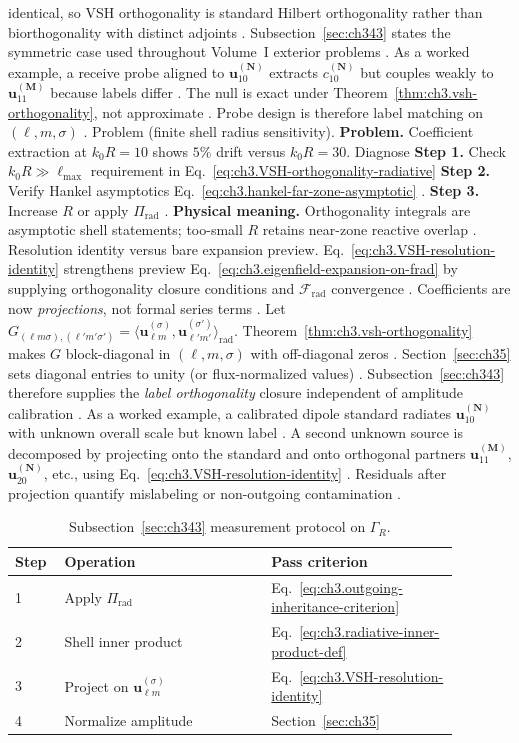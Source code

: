 identical, so VSH orthogonality is standard Hilbert orthogonality rather than biorthogonality with distinct adjoints
. Subsection~\ref{sec:ch343} states the symmetric case used throughout Volume~I
exterior problems .
As a worked example, a receive probe aligned to \(\mathbf{u}_{10}^{(\mathbf{N})}\) extracts \(c_{10}^{(\mathbf{N})}\) but couples weakly to
\(\mathbf{u}_{11}^{(\mathbf{M})}\) because labels differ . The null is exact under
Theorem~\ref{thm:ch3.vsh-orthogonality}, not approximate . Probe design is therefore label matching on
\((\ell,m,\sigma)\) .
Problem (finite shell radius sensitivity). \textbf{Problem.} Coefficient extraction at \(k_{0}R=10\) shows \(5\%\) drift versus \(k_{0}R=30\). Diagnose
\textbf{Step 1.} Check \(k_{0}R\gg\ell_{\max}\) requirement in Eq.~\eqref{eq:ch3.VSH-orthogonality-radiative}
\textbf{Step 2.} Verify Hankel asymptotics Eq.~\eqref{eq:ch3.hankel-far-zone-asymptotic} .
\textbf{Step 3.} Increase \(R\) or apply \(\Pi_{\mathrm{rad}}\) .
\textbf{Physical meaning.} Orthogonality integrals are asymptotic shell statements; too-small \(R\) retains near-zone
reactive overlap .
Resolution identity versus bare expansion preview. Eq.~\eqref{eq:ch3.VSH-resolution-identity} strengthens preview Eq.~\eqref{eq:ch3.eigenfield-expansion-on-frad} by
supplying orthogonality closure conditions and \(\mathcal{F}_{\mathrm{rad}}\) convergence . Coefficients
are now \emph{projections}, not formal series terms .
Let \(G_{(\ell m\sigma),(\ell'm'\sigma')}=\langle\mathbf{u}_{\ell m}^{(\sigma)},\mathbf{u}_{\ell'm'}^{(\sigma')}\rangle_{\mathrm{rad}}\).
Theorem~\ref{thm:ch3.vsh-orthogonality} makes \(G\) block-diagonal in \((\ell,m,\sigma)\) with off-diagonal zeros
. Section~\ref{sec:ch35} sets diagonal entries to unity (or flux-normalized values)
. Subsection~\ref{sec:ch343} therefore supplies the \emph{label orthogonality} closure
independent of amplitude calibration .
As a worked example, a calibrated dipole standard radiates \(\mathbf{u}_{10}^{(\mathbf{N})}\) with unknown overall scale but known label
. A second unknown source is decomposed by projecting onto the standard and onto
orthogonal partners \(\mathbf{u}_{11}^{(\mathbf{M})}\), \(\mathbf{u}_{20}^{(\mathbf{N})}\), etc., using
Eq.~\eqref{eq:ch3.VSH-resolution-identity} . Residuals after projection quantify mislabeling or
non-outgoing contamination .
\begin{table}[t]
\centering
\caption{Subsection~\ref{sec:ch343} measurement protocol on \(\Gamma_R\).}
\label{tab:ch3.343-measurement-protocol}
\small
\begin{tabular}{@{}p{0.08\linewidth}p{0.42\linewidth}p{0.38\linewidth}@{}}
\toprule
Step & Operation & Pass criterion \\
\midrule
1 & Apply \(\Pi_{\mathrm{rad}}\) & Eq.~\eqref{eq:ch3.outgoing-inheritance-criterion} \\
2 & Shell inner product & Eq.~\eqref{eq:ch3.radiative-inner-product-def} \\
3 & Project on \(\mathbf{u}_{\ell m}^{(\sigma)}\) & Eq.~\eqref{eq:ch3.VSH-resolution-identity} \\
4 & Normalize amplitude & Section~\ref{sec:ch35} \\
\bottomrule
\end{tabular}
\end{table}
